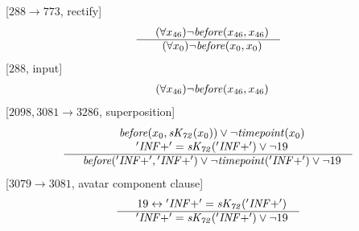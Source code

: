 \documentclass[border=10pt,preview,multi,varwidth=\maxdimen]{standalone}
\newenvironment{VampireStep}{}{}
\newenvironment{VampireInference}{%
   \begin{array}{c}}{\end{array}}
\newenvironment{VampirePremise}%
   {\begin{array}{l}}%
   {\end{array}}
\newenvironment{VampireConclusion}%
   {\begin{array}{l}}%
   {\end{array}}
\newcommand{\VPremiseSeparator}{\\}
\newcommand{\VConclusionSeparator}{\\ \hline}
\newcommand{\Vor}{\vee}
\newcommand{\Viff}{\leftrightarrow}
\begin{document}
\begin{VampireStep}
[$288\rightarrow 773$, rectify]\\
\[\begin{VampireInference}
\begin{VampirePremise}%
~~(\forall x_{46} )\neg \mathit{before} (x_{46},x_{46})
\end{VampirePremise}
\VConclusionSeparator
\begin{VampireConclusion}
~~(\forall x_{0} )\neg \mathit{before} (x_{0},x_{0})
\end{VampireConclusion}
\end{VampireInference}
\]
\end{VampireStep}
\begin{VampireStep}
[$288$, input]\\
\[\begin{VampireInference}
\begin{VampireConclusion}
~~(\forall x_{46} )\neg \mathit{before} (x_{46},x_{46})
\end{VampireConclusion}
\end{VampireInference}
\]
\end{VampireStep}
\begin{VampireStep}
[$2098,3081\rightarrow 3286$, superposition]\\
\[\begin{VampireInference}
\begin{VampirePremise}%
~~\mathit{before} (x_{0},\mathit{sK_{72}} (x_{0})) \Vor \neg \mathit{timepoint} (x_{0})
\end{VampirePremise}
\VPremiseSeparator
\begin{VampirePremise}%
~~\mathit{'INF+'} = \mathit{sK_{72}} (\mathit{'INF+'}) \Vor  \neg 19
\end{VampirePremise}
\VConclusionSeparator
\begin{VampireConclusion}
~~\mathit{before} (\mathit{'INF+'},\mathit{'INF+'}) \Vor \neg \mathit{timepoint} (\mathit{'INF+'}) \Vor  \neg 19
\end{VampireConclusion}
\end{VampireInference}
\]
\end{VampireStep}
\begin{VampireStep}
[$3079\rightarrow 3081$, avatar component clause]\\
\[\begin{VampireInference}
\begin{VampirePremise}%
~~19 \Viff \mathit{'INF+'} = \mathit{sK_{72}} (\mathit{'INF+'})
\end{VampirePremise}
\VConclusionSeparator
\begin{VampireConclusion}
~~\mathit{'INF+'} = \mathit{sK_{72}} (\mathit{'INF+'}) \Vor  \neg 19
\end{VampireConclusion}
\end{VampireInference}
\]
\end{VampireStep}
\end{document}
